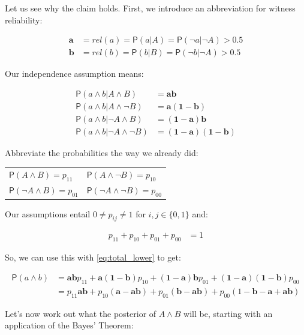 \documentclass[10pt,dvipsnames,enabledeprecatedfontcommands]{scrartcl}
\newcommand{\n}{\neg}
\newcommand{\et}{\wedge}
\newcommand{\pr}[1]{\mathsf{P}(#1)}
\begin{document}
Let us see why the claim holds. First, we introduce an abbreviation for
witness reliability:

\begin{align*}\mathbf{a} &=rel(a)=\pr{a\vert A}=\pr{\n a\vert \n A}>0.5\\ 
\mathbf{b} &=rel(b)=\pr{b\vert B}=\pr{\n b\vert \n A}>0.5
\end{align*}

Our independence assumption means:

\begin{align*}
\pr{a\et b \vert A\et B}  &= \mathbf{ab}\\
\pr{a\et b \vert A\et \n B} & = \mathbf{a(1-b)}\\
\pr{a\et b \vert \n A\et B}  & = \mathbf{(1-a)b}\\
\pr{a\et b \vert \n A\et \n  B}  & = \mathbf{(1-a)(1-b)}
\end{align*}

\vspace{-2mm}

Abbreviate the probabilities the way we already did:

\begin{center}
\begin{tabular}{ll}
$\pr{A\et B} = p_{11}$ & $\pr{A\et \n B} = p_{10}$\\
$\pr{\n A \et B} = p_{01}$ & $\pr{\n A \et \n B}=p_{00}$
\end{tabular}
\end{center}

Our assumptions entail \(0\neq p_{ij}\neq 1\) for \(i,j\in \{0,1\}\)
and:

\begin{align}\label{eq:sumupto1}
p_{11}+p_{10}+p_{01}+p_{00}&=1
\end{align}

\noindent So, we can use this with \eqref{eq:total_lower} to get:

\begin{align}\label{eq:aetb}
\pr{a\et b} & =  \mathbf{ab}p_{11} + \mathbf{a(1-b)}p_{10}+\mathbf{(1-a)b}p_{01} + \mathbf{(1-a)(1-b)}p_{00}\\ \nonumber
& = p_{11}\mathbf{ab} + p_{10}(\mathbf{a}-\mathbf{ab}) + p_{01}(\mathbf{b}-\mathbf{ab})+p_{00}(1-\mathbf{b}-\mathbf{a}+\mathbf{ab})
\end{align}

Let's now work out what the posterior of \(A\et B\) will be, starting
with an application of the Bayes' Theorem:
\end{document}
